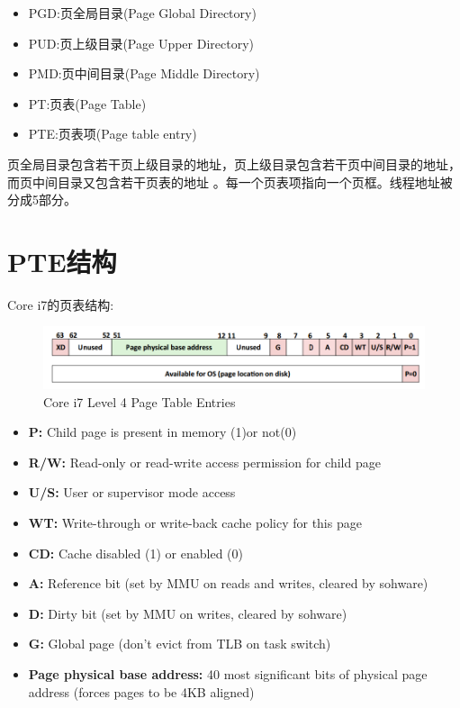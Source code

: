 \begin{itemize}
\item PGD:页全局目录(Page Global Directory)
\item PUD:页上级目录(Page Upper Directory)
\item PMD:页中间目录(Page Middle Directory)
\item PT:页表(Page Table)
\item PTE:页表项(Page table entry)
\end{itemize}

页全局目录包含若干页上级目录的地址，页上级目录包含若干页中间目录的地址，而页中间目录又包含若干页表的地址
。每一个页表项指向一个页框。线程地址被分成5部分。

\section{PTE结构}

Core i7的页表结构:

\begin{figure}[htbp]
\begin{center}
\includegraphics[width=1\textwidth]{pte.png}
\caption{Core i7 Level 4 Page Table	Entries}
\end{center}
\end{figure}


\begin{itemize}
\item \textbf{P:} Child page is present in memory (1)or not(0)	
\item \textbf{R/W:} Read-only or read-write access permission for child page	
\item \textbf{U/S:} User or	supervisor mode	access	
\item \textbf{WT:} Write-through or	write-back cache policy for this page	
\item \textbf{CD:} Cache disabled (1) or	enabled (0)	
\item \textbf{A:} Reference bit (set by MMU on reads and	writes, cleared	by sohware)	
\item \textbf{D:} Dirty bit (set	by MMU on writes, cleared by sohware)	
\item \textbf{G:} Global	page (don’t	evict from TLB on task switch)	
\item \textbf{Page physical base address:} 40 most significant bits of physical page address (forces pages to be	4KB	aligned)	
\end{itemize}



